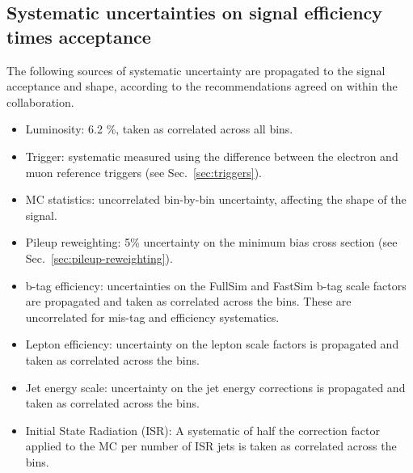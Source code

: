 

\subsection{Systematic uncertainties on signal efficiency times acceptance}
\label{sec:sig-syst}
The following sources of systematic uncertainty are propagated to the signal acceptance and shape, 
according to the recommendations agreed on within the collaboration. 

\begin{itemize}
  \item Luminosity: 6.2 \%, taken as correlated across all bins.
  \item Trigger: systematic measured using the difference between the electron and muon
  reference triggers (see Sec.~\ref{sec:triggers}). 
  \item MC statistics:  uncorrelated bin-by-bin uncertainty, affecting the shape of the signal. 
  \item Pileup reweighting: 5\% uncertainty on the minimum bias cross section (see Sec.~\ref{sec:pileup-reweighting}).
  \item b-tag efficiency: uncertainties on the FullSim and FastSim b-tag scale factors are propagated and taken as correlated across the bins. These are uncorrelated for mis-tag and efficiency systematics.
  \item Lepton efficiency: uncertainty on the lepton scale factors is propagated and taken as correlated across the bins. 
  \item Jet energy scale: uncertainty on the jet energy corrections is propagated and taken as correlated across the bins.
  \item Initial State Radiation (ISR): A systematic of half the correction factor applied to the MC per number of ISR jets is taken as correlated across the bins.
\end{itemize}



